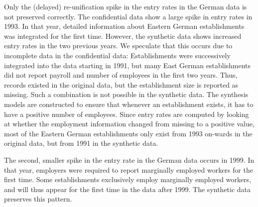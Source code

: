 \documentclass[10pt,twoside]{article}
\begin{document}
Only the (delayed) re-unification spike in the entry rates in the German data is not preserved correctly. The confidential data show a large spike in entry rates in 1993. In that year, detailed information about Eastern German establishments was integrated for the first time. However, the synthetic data shows increased entry rates in the two previous years. We speculate that this occurs due to incomplete data in the confidential data: Establishments were successively integrated into the data starting in 1991, but  many East German establishments did not report payroll and number of employees  in the first two years. Thus, records existed in the original data, but the establishment size is reported as missing. Such a combination is not possible in the synthetic data. The synthesis models are constructed to ensure that whenever an establishment exists, it has to have a positive number of employees. Since entry rates are computed by looking at whether the employment information changed from missing to a positive value, most of the Eastern German establishments only exist from 1993 on-wards in the original data, but from 1991 in the synthetic data.

The second, smaller spike in the entry rate in the German data occurs in 1999. In that year, employers were required to report  marginally employed workers  for the first time. Some establishments exclusively employ marginally employed workers, and will thus appear for the first time in the data after 1999. The synthetic data preserves this pattern. 
\end{document}
